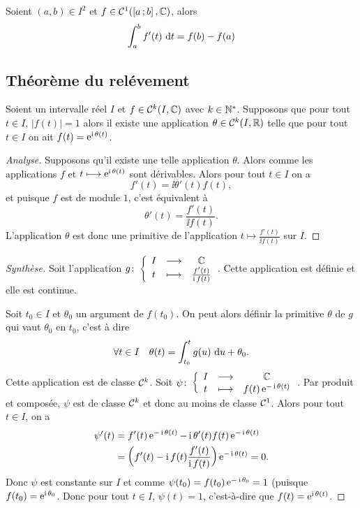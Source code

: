 \begin{cor}
  Soient \((a,b) \in I^2\) et \(f \in \mathcal{C}^{1}(\left[ a \, ; {} b \right],\mathbb{C})\),
  alors
  \begin{equation}
    \int_a^b f'(t)\,\mathop{}\mathopen{}\mathrm{d} t = f(b)-f(a)
  \end{equation}
\end{cor}

\subsection{Théorème du relévement}

\begin{theo}
  Soient un intervalle réel \(I\) et \(f \in \mathcal{C}^{k}(I,\mathbb{C})\) avec \(k \in
  \mathbb{N}^*\). Supposons que pour tout \(t \in I\), \(|f(t)| = 1\) alors il existe une
  application \(\theta \in \mathcal{C}^{k}(I,\mathbb{R})\) telle que pour tout \(t \in I\) on
  ait \(f(t) = \operatorname{e}^{\operatorname{i}\theta(t)}\).
\end{theo}

\begin{proof}[Analyse]
  Supposons qu'il existe une telle application \(\theta\). Alors comme les
  applications \(f\) et \(t \longmapsto \operatorname{e}^{\operatorname{i}\theta(t)}\) sont dérivables.
  Alors pour tout \(t\in I\) on a
  \begin{equation}
    f'(t) = \ii \theta'(t)f(t),
  \end{equation}
  et puisque \(f\) est de module \(1\), c'est équivalent à
  \begin{equation}
    \theta'(t) = \frac{f'(t)}{\ii f(t)}.
  \end{equation}
L'application \(\theta\) est donc une primitive de l'application \(t \longmapsto
\frac{f'(t)}{\ii f(t)}\) sur \(I\). \end{proof}
\begin{proof}[Synthèse]
  Soit l'application \(g\colon\left\{\begin{array}{ccc}I & \longrightarrow &\mathbb{C}\\t & \longmapsto & \frac{f'(t)}{\operatorname{i} f(t)}\end{array}\right.\). Cette
  application est définie et elle est continue.

  Soit \(t_0 \in I\) et \(\theta_0\) un argument de \(f(t_0)\). On peut alors
  définir la primitive \(\theta\) de \(g\) qui vaut \(\theta_0\) en \(t_0\),
  c'est à dire
  \begin{equation}
    \forall t \in I \quad \theta(t) = \int_{t_0}^t g(u)\,\mathop{}\mathopen{}\mathrm{d} u +\theta_0.
  \end{equation}
  Cette application est de classe \(\mathcal{C}^{k}\). Soit
  \(\psi\colon\left\{\begin{array}{ccc}I & \longrightarrow &\mathbb{C}\\t & \longmapsto & f(t)\operatorname{e}^{-\operatorname{i}\theta(t)}\end{array}\right.\). Par produit et
  composée, \(\psi\) est de classe \(\mathcal{C}^{k}\) et donc au moins de classe
  \(\mathcal{C}^{1}\). Alors pour tout \(t \in I\), on a
  \begin{align*}
    \psi'(t) &= f'(t)\operatorname{e}^{-\operatorname{i} \theta(t)}-\operatorname{i} \theta'(t)f(t) \operatorname{e}^{-\operatorname{i}\theta(t)}
    \\
    & = \left(f'(t)-\operatorname{i} f(t) \frac{f'(t)}{\operatorname{i} f(t)} \right)\operatorname{e}^{-\operatorname{i} \theta(t)} =0.
  \end{align*}
  Donc \(\psi\) est constante sur \(I\) et comme \(\psi(t_0) = f(t_0)\operatorname{e}^{-\operatorname{i}
  \theta_0} = 1\) (puisque \(f(t_0) = \operatorname{e}^{\operatorname{i} \theta_0}\). Donc pour tout \(t \in
  I\), \(\psi(t) = 1\), c'est-à-dire que \(f(t) = \operatorname{e}^{\operatorname{i} \theta(t)}\).
\end{proof}

